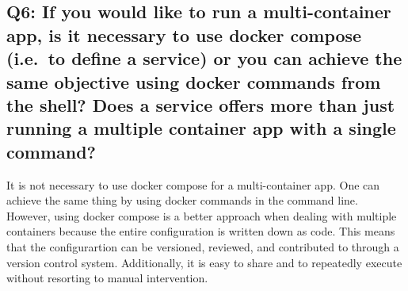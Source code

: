 \documentclass[
]{article}
\begin{document}
\hypertarget{q6-if-you-would-like-to-run-a-multi-container-app-is-it-necessary-to-use-docker-compose-i.e.-to-define-a-service-or-you-can-achieve-the-same-objective-using-docker-commands-from-the-shell-does-a-service-offers-more-than-just-running-a-multiple-container-app-with-a-single-command}{%
\subsection{Q6: If you would like to run a multi-container app, is it
necessary to use docker compose (i.e.~to define a service) or you can
achieve the same objective using docker commands from the shell? Does a
service offers more than just running a multiple container app with a
single
command?}\label{q6-if-you-would-like-to-run-a-multi-container-app-is-it-necessary-to-use-docker-compose-i.e.-to-define-a-service-or-you-can-achieve-the-same-objective-using-docker-commands-from-the-shell-does-a-service-offers-more-than-just-running-a-multiple-container-app-with-a-single-command}}

It is not necessary to use docker compose for a multi-container app. One
can achieve the same thing by using docker commands in the command line.
However, using docker compose is a better approach when dealing with
multiple containers because the entire configuration is written down as
code. This means that the configurartion can be versioned, reviewed, and
contributed to through a version control system. Additionally, it is
easy to share and to repeatedly execute without resorting to manual
intervention.
\end{document}
